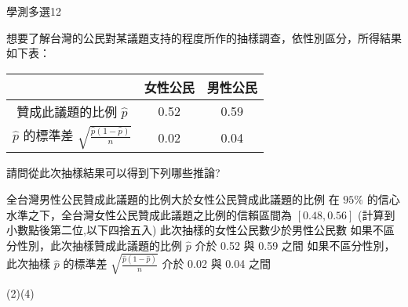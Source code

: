     \begin{QUESTION}
        \begin{ExamInfo}{99}{學測}{多選}{12}
        \end{ExamInfo}
        \begin{ExamAnsRateInfo}{21}{37}{16}{10}
        \end{ExamAnsRateInfo}
        \begin{QBODY}
            想要了解台灣的公民對某議題支持的程度所作的抽樣調查，依性別區分，所得結果如下表：
			\begin{center}
				\begin{tabular}{|c|c|c|}
					\hline
					& 女性公民& 男性公民 \\
					\hline
					贊成此議題的比例 $\hat{p}$ & 0.52 &  0.59 \\\hline
					$\hat{p}$ 的標準差   $\sqrt{\frac{\hat{p}(1-\hat{p})}{n}}$ &  0.02 & 0.04 \\\hline
				\end{tabular}
			\end{center}
			
			請問從此次抽樣結果可以得到下列哪些推論?

			\begin{QOPS} 
				\QOP 全台灣男性公民贊成此議題的比例大於女性公民贊成此議題的比例
				\QOP 在 $95\%$ 的信心水準之下，全台灣女性公民贊成此議題之比例的信賴區間為
			$[0.48,0.56]$ (計算到小數點後第二位,以下四捨五入)
				\QOP 此次抽樣的女性公民數少於男性公民數
				\QOP 如果不區分性別，此次抽樣贊成此議題的比例 $\hat{p}$ 介於 0.52 與 0.59 之間
				\QOP 如果不區分性別，此次抽樣 $\hat{p}$ 的標準差 $\sqrt{\frac{\hat{p}(1-\hat{p})}{n}}$ 介於 0.02 與 0.04 之間
			\end{QOPS}
        \end{QBODY}
        \begin{QFROMS}
        \end{QFROMS}
        \begin{QTAGS}\end{QTAGS}
        \begin{QANS}
            (2)(4)
        \end{QANS}
        \begin{QSOLLIST}
        \end{QSOLLIST}
        \begin{QEMPTYSPACE}
        \end{QEMPTYSPACE}
    \end{QUESTION}

